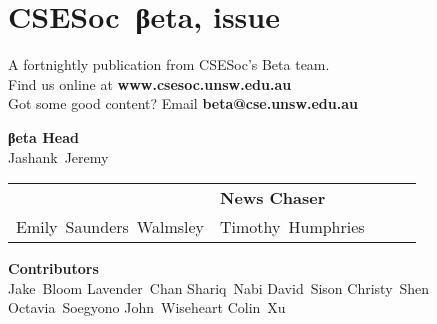 \documentclass[twoside]{article}
\date{22 March 2016}
\makeatletter
\gdef\the@issue{114}
\makeatother
\begin{document}

\newpage
\maketitle\thispagestyle{mag}
\vspace*{-2em}\section*{CSE{}Soc~βeta, issue \makeatletter\the@issue}
\begin{multicols}{2}\begingroup\raggedcolumns
\begin{center}
A fortnightly publication from CSESoc's Beta team.\\
Find us online at \textbf{www.csesoc.unsw.edu.au}\\
Got some good content? Email \textbf{beta@cse.unsw.edu.au}\\
\par{\bf\sffamily βeta Head}\\ Jashank~Jeremy
\par\begin{tabular}{>{\raggedleft}p{0.5\linewidth}>{\raggedright}p{0.5\linewidth}}
{\bf\sffamily Puzzle Wrangler} & {\bf\sffamily News Chaser}\tabularnewline
Emily~Saunders~Walmsley & Timothy~Humphries\tabularnewline
\end{tabular}
\par{\bf\sffamily Contributors}\\
  Jake~Bloom\hsp{}
  Lavender~Chan\hsp{}
  Shariq~Nabi\hsp{}
  David~Sison\hsp{}
  Christy~Shen\hsp{}
  Octavia~Soegyono\hsp{}
  John~Wiseheart\hsp{}
  Colin~Xu\hsp{}
\end{center}
\columnbreak\malcontents\vfill\endgroup
\end{multicols}\LRmulticolcolumns
\vspace*{-4em}\begin{multicols}{2}


\end{multicols}
\end{document}
